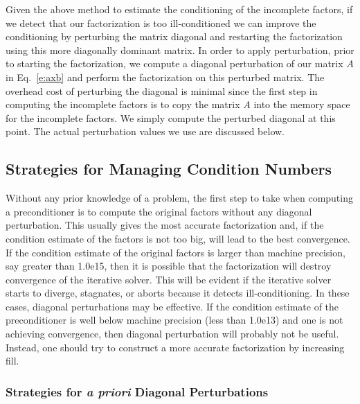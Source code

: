 \documentclass[12pt,relax]{AztecOOUserGuide}
\begin{document}
Given the above method to estimate the conditioning of the incomplete factors,
if we detect that our factorization is too ill-conditioned
we can improve the conditioning by perturbing the matrix diagonal and
restarting the factorization using
this more diagonally dominant matrix.  In order to apply perturbation, 
prior to starting
the factorization, we compute a diagonal perturbation of our matrix
$A$ in Eq.~\ref{e:axb} and perform the factorization on this perturbed
matrix.  The overhead cost of perturbing the diagonal is minimal since
the first step in computing the incomplete factors is to copy the
matrix $A$ into the memory space for the incomplete factors.  We
simply compute the perturbed diagonal at this point.  The actual
perturbation values we use are discussed below.


\subsection{Strategies for Managing Condition Numbers}

Without any prior knowledge of a problem, the first step to take when
computing a preconditioner is to compute the original factors without
any diagonal perturbation.  This usually gives the most accurate
factorization and, if the condition estimate of the factors is not too
big, will lead to the best convergence.  If the condition estimate of
the original factors is larger than machine precision, say greater
than 1.0e15, then it is possible that the factorization will destroy
convergence of the iterative solver.  This will be evident if the
iterative solver starts to diverge, stagnates, or aborts because
it detects ill-conditioning.  In these cases, diagonal perturbations 
may be effective.  If the condition estimate of the preconditioner is 
well below machine precision (less than 1.0e13) and one is not achieving
convergence, then diagonal perturbation will probably not be useful.  
Instead, one should try to construct a more accurate factorization by
increasing fill.

\subsubsection{Strategies for {\bf\it a priori} Diagonal Perturbations}
\end{document}
